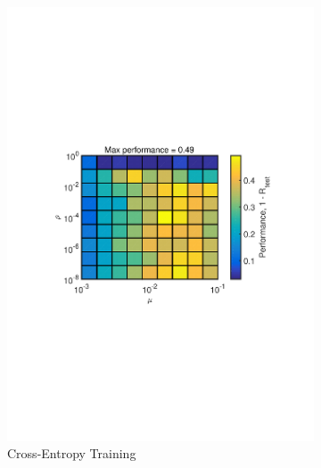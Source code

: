 \documentclass[journal,a4paper,onecolumn,11pt]{IEEEtran}
\begin{document}
\begin{figure}[!h]
\begin{subfigure}{.5\textwidth}
		\includegraphics[width=\textwidth]{para_opt_hwchar_ce.pdf}
		\caption{Cross-Entropy Training}
		\label{fig:para_opt_hwchar_ce}
	\end{subfigure}
	\begin{subfigure}{.5\textwidth}
		\centering

\end{subfigure}
\end{figure}
\end{document}
